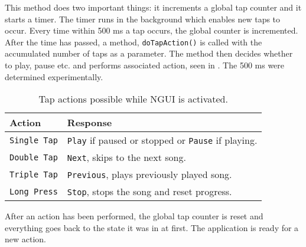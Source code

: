 This method does two important things: it increments a global tap counter and it starts a timer. The timer runs in the background which enables new taps to occur. Every time within 500 ms a tap occurs, the global counter is incremented. After the time has passed, a method, \texttt{doTapAction()} is called with the accumulated number of taps as a parameter. The method then decides whether to play, pause etc. and performs associated action, seen in . The 500 ms were determined experimentally.

\begin{table}
\begin{tabular}{|l|l|} \hline
	\textbf{Action} & \textbf{Response} \\\hline
	\texttt{Single Tap} & \texttt{Play} if paused or stopped or \texttt{Pause} if playing. \\\hline
	\texttt{Double Tap} & \texttt{Next}, skips to the next song. \\\hline
	\texttt{Triple Tap} & \texttt{Previous}, plays previously played song. \\\hline
	\texttt{Long Press} & \texttt{Stop}, stops the song and reset progress. \\\hline		
\end{tabular}
\caption[Table caption text]{Tap actions possible while NGUI is activated.}
\label{table:tap}
\end{table}

After an action has been performed, the global tap counter is reset and everything goes back to the state it was in at first. The application is ready for a new action.